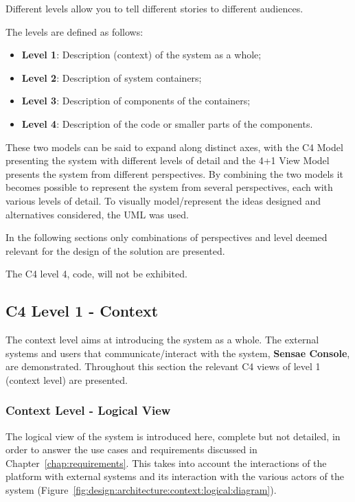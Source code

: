 Different levels allow you to tell different stories to different audiences.

The levels are defined as follows:
\begin{itemize}
   \item \textbf{Level 1}: Description (context) of the system as a whole;
   \item \textbf{Level 2}: Description of system containers;
   \item \textbf{Level 3}: Description of components of the containers;
   \item \textbf{Level 4}: Description of the code or smaller parts of the components.
\end{itemize}

These two models can be said to expand along distinct axes, with the
C4 Model presenting the system with different levels of detail and the 4+1 View Model presents the system from different perspectives. By combining the two models it becomes possible to represent the system from several perspectives, each with various levels of detail.
To visually model/represent the ideas designed and alternatives considered, the \gls{UML} was used.

In the following sections only combinations of perspectives and level deemed relevant for the design of the solution are presented.

The C4 level 4, code, will not be exhibited.

\subsection{C4 Level 1 - Context}
\label{subsec:design:architecture:context}

The context level aims at introducing the system as a whole. The external systems and users that communicate/interact with the system, \textbf{Sensae Console}, are demonstrated.
Throughout this section the relevant C4 views of level 1 (context level) are presented.

\subsubsection{Context Level - Logical View}
\label{subsubsec:design:architecture:context:logical}

The logical view of the system is introduced here, complete but not detailed, in order to answer the use cases and requirements discussed in Chapter~\ref{chap:requirements}. This takes into account the interactions of the platform with external systems and its interaction with the various actors of the system (Figure~\ref{fig:design:architecture:context:logical:diagram}).

